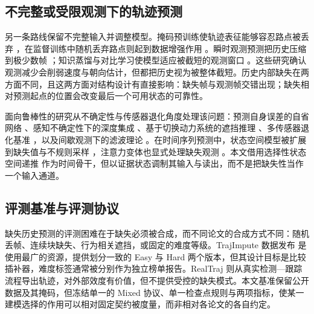 \subsection{不完整或受限观测下的轨迹预测}

另一条路线保留不完整输入并调整模型。掩码预训练使轨迹表征能够容忍路点被丢弃 \cite{yang2023rmp,chen2023trajmae}，在监督训练中随机丢弃路点则起到数据增强作用 \cite{chib2023dropping}。瞬时观测预测把历史压缩到极少数帧 \cite{sun2022momentary}；知识蒸馏与对比学习使模型适应被截短的观测窗口 \cite{monti2022howmany,qiu2025adapting}。这些研究确认观测减少会削弱速度与朝向估计，但都把历史视为被整体截短。历史内部缺失在两方面不同，且这两方面对结构设计有直接影响：缺失帧与观测帧交错出现；缺失相对预测起点的位置会改变最后一个可用状态的可靠性。

面向鲁棒性的研究从不确定性与传感器退化角度处理该问题：预测自身误差的自省网络 \cite{itkina2022interpretable}、感知不确定性下的深度集成 \cite{nayak2023deepensembles}、基于切换动力系统的遮挡推理 \cite{wei2024navigation}、多传感器退化基准 \cite{mohta2021multisensor,sanchez2023robustness}，以及间歇观测下的滤波理论 \cite{sinopoli2004kalman}。在时间序列预测中，状态空间模型被扩展到缺失值与不规则采样 \cite{gu2022efficient,peng2025s4m,yalavarthi2025profit}，注意力变体也显式处理缺失观测 \cite{gao2021gradient,becker2021missformer}。本文借用选择性状态空间递推 \cite{gu2023mamba} 作为时间骨干，但以证据状态调制其输入与读出，而不是把缺失性当作一个输入通道。

\subsection{评测基准与评测协议}

缺失历史预测的评测困难在于缺失必须被合成，而不同论文的合成方式不同：随机丢帧、连续块缺失、行为相关遮挡，或固定的难度等级。TrajImpute 数据发布 \cite{chib2024pedestrian} 是使用最广的资源，提供划分一致的 Easy 与 Hard 两个版本，但其设计目标是比较插补器，难度标签通常被分别作为独立榜单报告。RealTraj \cite{fujii2024realtraj} 则从真实检测—跟踪流程导出轨迹，对外部效度有价值，但不提供受控的缺失模式。本文基准保留公开数据及其掩码，但冻结单一的 Mixed 协议、单一检查点规则与两项指标，使某一建模选择的作用可以相对固定契约被度量，而非相对各论文的各自约定。
